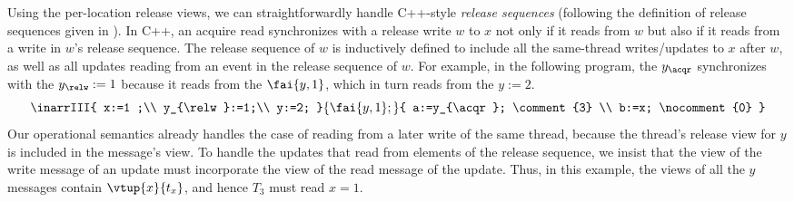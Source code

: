 Using the per-location release views, 
we can straightforwardly handle C++-style \emph{release sequences}
(following the  definition of release sequences given in \cite{c11comp}).
In C++, an acquire read synchronizes with a release write $w$ to $x$ not only if it reads from $w$
but also if it reads from a write in $w$'s release sequence.
The release sequence of $w$ is inductively defined to include all the same-thread writes/updates to $x$ after $w$, 
as well as all updates reading from an event in the release sequence of $w$.
For example, in the following program, the $y_{\acqr}$ synchronizes with the $y_{\relw}:=1$ 
because it reads from the $\fai{y,1}$, which in turn reads from the $y:=2$.
$$
\inarrIII{ x:=1 ;\\ y_{\relw}:=1;\\ y:=2; }
         { \fai{y,1}; }
         { a:=y_{\acqr}; \comment{3} \\ b:=x; \nocomment{0} }
$$
Our operational semantics already handles the case of reading from a later write of the same thread,
because the thread's release view for $y$ is included in the message's view.
To handle the updates that read from elements of the release sequence, 
we insist that the view of the write message of an update must incorporate the view of the read message of the update.
Thus, in this example, the views of all the $y$ messages contain $\vtup{x}{t_x}$,
and hence $T_3$ must read $x=1$.

